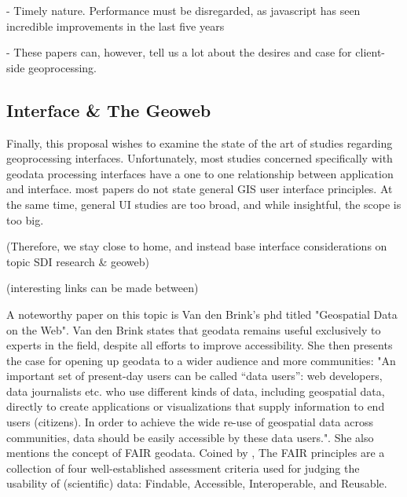 - Timely nature. Performance must be disregarded, as javascript has seen incredible improvements in the last five years \cite{haas_bringing_2017, sandhu_sparse_2018}

- These papers can, however, tell us a lot about the desires and case for client-side geoprocessing.





\subsection{Interface \& The Geoweb}

%


Finally, this proposal wishes to examine the state of the art of studies regarding geoprocessing interfaces. Unfortunately, most studies concerned specifically with geodata processing interfaces have a one to one relationship between application and interface. most papers do not state general GIS user interface principles. At the same time, general UI studies are too broad, and while insightful, the scope is too big. 

(Therefore, we stay close to home, and instead base interface considerations on topic SDI research \& geoweb)

(interesting links can be made between)

A noteworthy paper on this topic is Van den Brink's phd titled "Geospatial Data on the Web". Van den Brink states that geodata remains useful exclusively to experts in the field, despite all efforts to improve accessibility. 
She then presents the case for opening up geodata to a wider audience and more communities: "An important set of present-day users can be called “data users”: web developers, data journalists etc. who use different kinds of data, including geospatial data, directly to create applications or visualizations that supply information to end users (citizens). In order to achieve the wide re-use of geospatial data across communities, data should be easily accessible by these data users.". She also mentions the concept of FAIR geodata. Coined by \cite{mark_d_wilkinson_fair_2016}, The FAIR principles are a collection of four well-established assessment criteria used for judging the usability of (scientific) data: Findable, Accessible, Interoperable, and Reusable. 


